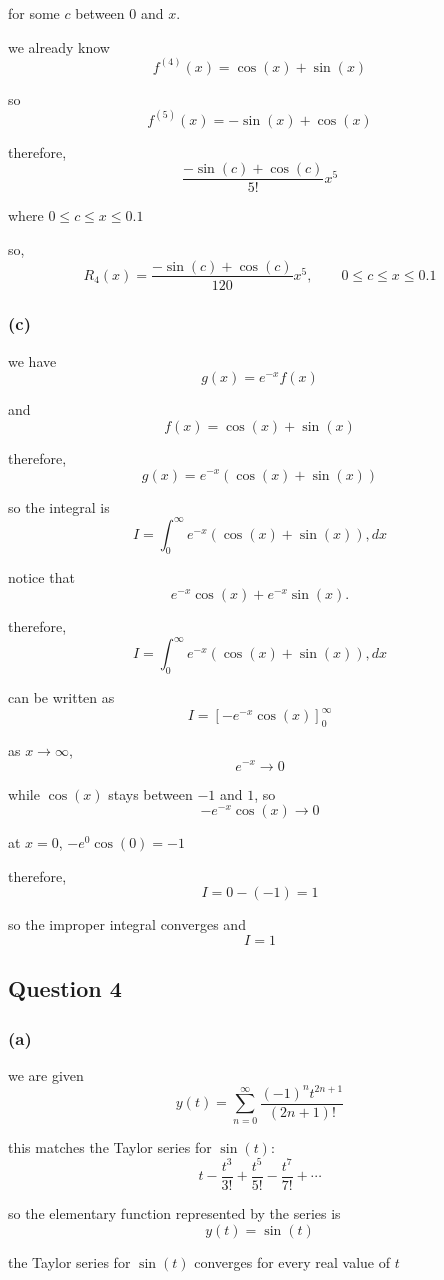 \documentclass{article}
\begin{document}
for some $c$ between $0$ and $x$.

we already know
\[
f^{(4)}(x)=\cos(x)+\sin(x)
\]

so
\[
f^{(5)}(x)=-\sin(x)+\cos(x)
\]

therefore,
\[
\frac{-\sin(c)+\cos(c)}{5!}x^5
\]

where $0\leq c\leq x\leq0.1$

so,
\[
\boxed{
R_4(x)=\frac{-\sin(c)+\cos(c)}{120}x^5, \qquad 0\leq c\leq x\leq0.1
}
\]

\subsubsection*{(c)}
we have
\[
g(x)=e^{-x}f(x)
\]

and
\[
f(x)=\cos(x)+\sin(x)
\]

therefore,
\[
g(x)=e^{-x}(\cos(x)+\sin(x))
\]

so the integral is
\[
I=\int_0^\infty e^{-x}(\cos(x)+\sin(x)),dx
\]

notice that
\[
e^{-x}\cos(x)+e^{-x}\sin(x).
\]

therefore,
\[
I=\int_0^\infty e^{-x}(\cos(x)+\sin(x)),dx
\]

can be written as
\[
I=\left[-e^{-x}\cos(x)\right]_0^\infty
\]

as $x\to\infty$,
\[
e^{-x}\to0
\]

while $\cos(x)$ stays between $-1$ and $1$, so
\[
-e^{-x}\cos(x)\to0
\]

at $x=0$, $-e^0\cos(0)=-1$

therefore,
\[
I=0-(-1)=1
\]

so the improper integral converges and
\[
\boxed{I=1}
\]

\subsection{Question 4}

\subsubsection*{(a)}
we are given
\[
y(t)=\sum_{n=0}^{\infty} \frac{(-1)^nt^{2n+1}}{(2n+1)!}
\]

this matches the Taylor series for $\sin(t)$:
\[
t-\frac{t^3}{3!} + \frac{t^5}{5!} - \frac{t^7}{7!} + \cdots
\]

so the elementary function represented by the series is
\[
\boxed{y(t)=\sin(t)}
\]

the Taylor series for $\sin(t)$ converges for every real value of $t$
\end{document}
